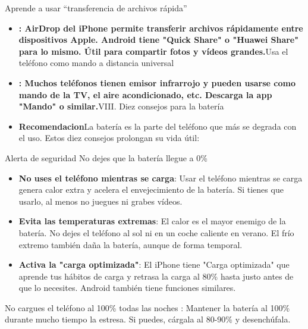
Aprende a usar “transferencia de archivos rápida”

\begin{itemize}
  \item \textbf{: AirDrop del iPhone permite transferir archivos rápidamente entre dispositivos Apple. Android tiene "Quick Share" o "Huawei Share" para lo mismo. Útil para compartir fotos y vídeos grandes.}Usa el teléfono como mando a distancia universal
  \item \textbf{: Muchos teléfonos tienen emisor infrarrojo y pueden usarse como mando de la TV, el aire acondicionado, etc. Descarga la app "Mando" o similar.}VIII. Diez consejos para la batería
  \item \textbf{Recomendacion}La batería es la parte del teléfono que más se degrada con el uso. Estos diez consejos prolongan su vida útil:
\end{itemize}

\begin{tcbwarn}{Alerta de seguridad}
No dejes que la batería llegue a 0\%

\end{tcbwarn}


\begin{itemize}
  \item \textbf{No uses el teléfono mientras se carga}: Usar el teléfono mientras se carga genera calor extra y acelera el envejecimiento de la batería. Si tienes que usarlo, al menos no juegues ni grabes vídeos.
  \item \textbf{Evita las temperaturas extremas}: El calor es el mayor enemigo de la batería. No dejes el teléfono al sol ni en un coche caliente en verano. El frío extremo también daña la batería, aunque de forma temporal.
  \item \textbf{Activa la "carga optimizada"}: El iPhone tiene "Carga optimizada" que aprende tus hábitos de carga y retrasa la carga al 80\% hasta justo antes de que lo necesites. Android también tiene funciones similares.
\end{itemize}

\begin{tcbinfo}{No cargues el teléfono al 100\% todas las noches}
: Mantener la batería al 100\% durante mucho tiempo la estresa. Si puedes, cárgala al 80-90\% y desenchúfala.

\end{tcbinfo}

